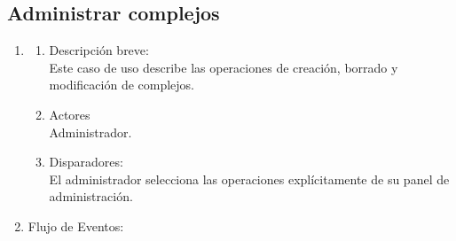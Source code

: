 \documentclass[a4paper,11pt]{article}
\begin{document}
\subsection{Administrar complejos}
\begin{enumerate}

    \item
    \begin{enumerate}
    \item Descripción breve: \\
        Este caso de uso describe las operaciones de creación, borrado y
        modificación de complejos.
    \item Actores \\
        Administrador.
    \item Disparadores: \\
        El administrador selecciona las operaciones explícitamente de su panel
        de administración.
    \end{enumerate}

    \item Flujo de Eventos: 

    \begin{enumerate}


\end{enumerate}
\end{enumerate}
\end{document}
